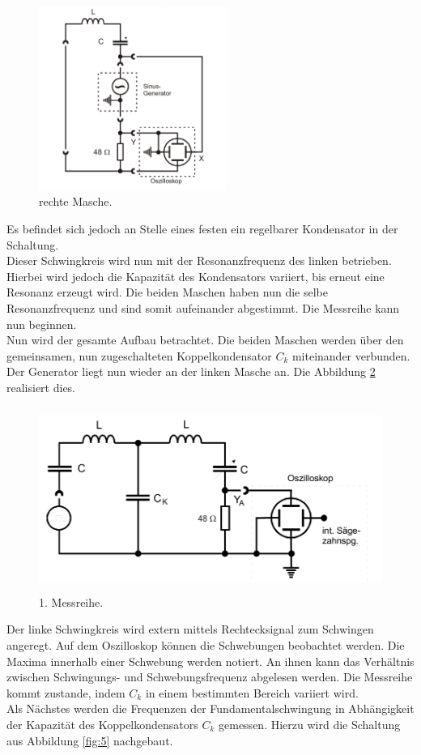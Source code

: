 \begin{figure}[H]
  \centering
  \includegraphics[height=6cm]{just2.png}
  \caption{rechte Masche.}
  \label{fig:3}
\end{figure}

Es befindet sich jedoch an Stelle eines festen ein regelbarer Kondensator in der Schaltung.\\
Dieser Schwingkreis wird nun mit der Resonanzfrequenz des linken betrieben.
Hierbei wird jedoch die Kapazität des Kondensators variiert, bis erneut eine Resonanz erzeugt wird.
Die beiden Maschen haben nun die selbe Resonanzfrequenz und sind somit aufeinander abgestimmt.
Die Messreihe kann nun beginnen.\\
Nun wird der gesamte Aufbau betrachtet.
Die beiden Maschen werden über den gemeinsamen, nun zugeschalteten Koppelkondensator $C_k$ miteinander verbunden.
Der Generator liegt nun wieder an der linken Masche an.
Die Abbildung \ref{fig:4} realisiert dies.

\begin{figure}[H]
  \centering
  \includegraphics[height=6cm]{a.png}
  \caption{1. Messreihe. \cite{sample}}
  \label{fig:4}
\end{figure}

Der linke Schwingkreis wird extern mittels Rechtecksignal zum Schwingen angeregt.
Auf dem Oszilloskop können die Schwebungen beobachtet werden.
Die Maxima innerhalb einer Schwebung werden notiert.
An ihnen kann das Verhältnis zwischen Schwingungs- und Schwebungsfrequenz abgelesen werden.
Die Messreihe kommt zustande, indem $C_k$ in einem bestimmten Bereich variiert wird.\\
Als Nächstes werden die Frequenzen der Fundamentalschwingung in Abhängigkeit der Kapazität des Koppelkondensators $C_k$ gemessen.
Hierzu wird die Schaltung aus Abbildung \ref{fig:5} nachgebaut.

